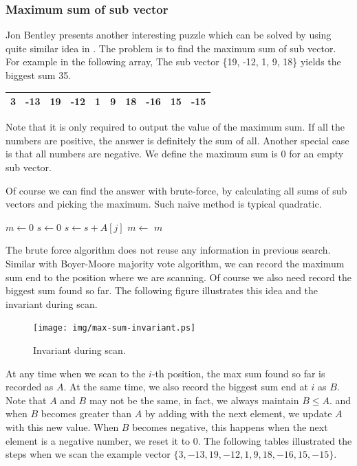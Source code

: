 \documentclass[UTF8]{article}
\begin{document}
\subsubsection{Maximum sum of sub vector}
Jon Bentley presents another interesting puzzle which can be solved by using quite similar idea in \cite{programming-pearls}.
The problem is to find the maximum sum of sub vector. For example in the following array, The sub vector
\{19, -12, 1, 9, 18\} yields the biggest sum 35.

\begin{tabular}{|c|c|c|c|c|c|c|c|c|c|}
\hline
3 & -13 & 19 & -12 & 1 & 9 & 18 & -16 & 15 & -15 \\
\hline
\end{tabular}

Note that it is only required to output the value of the maximum sum. If all the numbers are positive, the answer is
definitely the sum of all. Another special case is that all numbers are negative. We define the maximum sum is 0 for
an empty sub vector.

Of course we can find the answer with brute-force, by calculating all sums of sub vectors and picking the maximum. Such naive
method is typical quadratic.

\begin{algorithmic}[1]
  \State $m \gets 0$
    \State $s \gets 0$
      \State $s \gets s + A[j]$
      \State $m \gets $ 
    \EndFor
  \EndFor
  \State \Return $m$
\EndFunction
\end{algorithmic}

The brute force algorithm does not reuse any information in previous search. Similar with Boyer-Moore majority
vote algorithm, we can record the maximum sum end to the position where we are scanning. Of course we also need
record the biggest sum found so far. The following figure illustrates this idea and the invariant during scan.

\begin{figure}[htbp]
 \centering
 \texttt{[image: img/max-sum-invariant.ps]}
 \caption{Invariant during scan.}
 \label{fig:max-sum-invariant}
\end{figure}

At any time when we scan to the $i$-th position, the max sum found so far is recorded as $A$. At the same time, we
also record the biggest sum end at $i$ as $B$. Note that $A$ and $B$ may not be the same, in fact, we always maintain
$B \leq A$. and when $B$ becomes greater than $A$ by adding with the next element,
we update $A$ with this new value. When $B$ becomes negative, this happens when the next element is a negative number,
we reset it to 0. The following tables illustrated the steps when we scan the example vector
$\{3, -13, 19, -12, 1, 9, 18, -16, 15, -15\}$.
\end{document}
